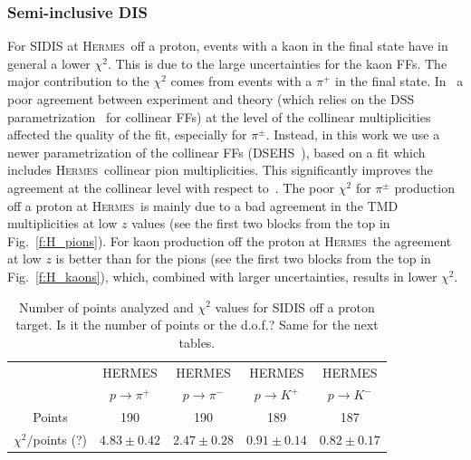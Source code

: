 \documentclass[aps,preprintnumbers,showpacs,nofootinbib,superscriptaddress,floatfix]{revtex4}
\newcommand{\AS}[1]{{\textcolor[rgb]{1,0,1}{#1}}}
\newcommand{\hermes}{\textsc{Hermes}}
\begin{document}
\subsubsection*{Semi-inclusive DIS}
\label{sss:SIDIS_agreement}


For SIDIS at \hermes\ off a proton, events with a kaon in the final state have in general a lower $\chi^2$. This is due to the large uncertainties for the kaon FFs. 
The major contribution to the $\chi^2$ comes from events with a $\pi^+$ in the final state. 
In~\cite{Signori:2013mda,Signori:2013gra} a poor agreement between experiment and theory (which relies on the DSS parametrization~\cite{deFlorian:2007aj} for collinear FFs) at the level of the collinear multiplicities affected the quality of the fit, especially for $\pi^\pm$. Instead, in this work we use a newer parametrization of the collinear FFs (DSEHS~\cite{deFlorian:2014xna}), based on a fit which includes \hermes\ collinear pion multiplicities. This significantly improves the agreement at the collinear level with respect to~\cite{Signori:2013mda,Signori:2013gra}. 
The poor $\chi^2$ for $\pi^\pm$ production off a proton at \hermes\ is mainly due to a bad agreement in the TMD \AS{multiplicities} at low $z$ values (see the first two blocks from the top in Fig.~\ref{f:H_pions}). 
For kaon production off the proton at \hermes\ the agreement at low $z$ is better than for the pions (see the first two blocks from the top in Fig.~\ref{f:H_kaons}), which, combined with larger uncertainties, results in lower $\chi^2$.
\begin{table}[h!]
\begin{center}
\begin{tabular}{|c|c|c|c|c|}
 \hline
\hline
  & HERMES & HERMES & HERMES & HERMES \\   
 &  $p \to \pi^+$    &   $p \to \pi^-$    &  $p \to K^+$    &   $p \to K^-$
 \\
 \hline
 Points         &  190 & 190 & 189 & 187       \\
 \hline
$\chi^2 /$\AS{points (?)} & $4 .83\pm 0.42$ & $2 .47\pm 0.28$ & $0 .91\pm 0.14$ & $0 .82\pm 0.17$   \\            
\hline
\hline
\end{tabular}
\caption{Number of points analyzed and $\chi^2$ values for SIDIS off a proton target. \AS{Is it the number of points or the d.o.f.? Same for the next tables.}}
\label{t:fl_ind_chi2_eP}
\end{center}
\end{table}
\end{document}
